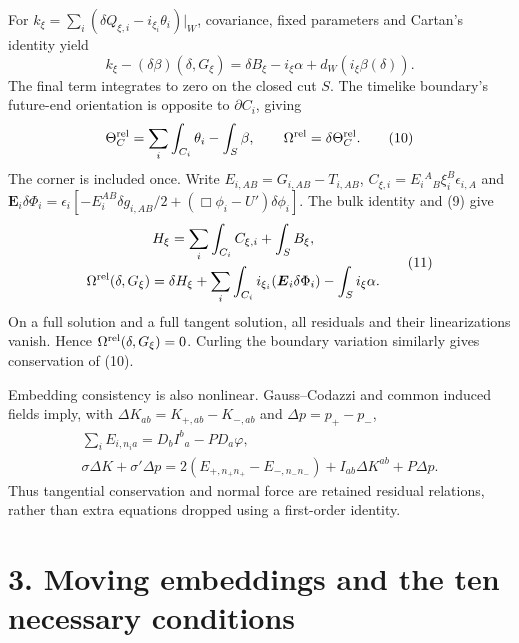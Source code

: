 \documentclass[
  10pt,
]{article}
\begin{document}
For \(k_\xi=\sum_i(\delta Q_{\xi,i}-i_{\xi_i}\theta_i)|_W\), covariance,
fixed parameters and Cartan's identity yield \[
 k_\xi-(\delta\beta)(\delta,G_\xi)
 =\delta B_\xi-i_\xi\alpha+d_W(i_\xi\beta(\delta)).       \tag{9}
\] The final term integrates to zero on the closed cut \(S\). The
timelike boundary's future-end orientation is opposite to
\(\partial C_i\), giving \[
 \Theta_C^{\rm rel}=\sum_i\int_{C_i}\theta_i-\int_S\beta,
 \qquad\Omega^{\rm rel}=\delta\Theta_C^{\rm rel}.         \tag{10}
\] The corner is included once. Write \(E_{i,AB}=G_{i,AB}-T_{i,AB}\),
\(C_{\xi,i}=E_i{}^A{}_B\xi_i^B\epsilon_{i,A}\) and
\(\boldsymbol E_i\delta\Phi_i=\epsilon_i[-E_i^{AB}\delta g_{i,AB}/2
+(\Box\phi_i-U')\delta\phi_i]\). The bulk identity and (9) give \[
 \begin{gathered}
 H_\xi=\sum_i\int_{C_i}C_{\xi,i}+\int_S B_\xi,\\
 \Omega^{\rm rel}(\delta,G_\xi)
 =\delta H_\xi+\sum_i\int_{C_i}i_{\xi_i}
           (\boldsymbol E_i\delta\Phi_i)-\int_S i_\xi\alpha .
 \end{gathered}                                           \tag{11}
\] On a full solution and a full tangent solution, all residuals and
their linearizations vanish. Hence \(\Omega^{\rm rel}(\delta,G_\xi)=0\).
Curling the boundary variation similarly gives conservation of (10).

Embedding consistency is also nonlinear. Gauss--Codazzi and common
induced fields imply, with \(\Delta K_{ab}=K_{+,ab}-K_{-,ab}\) and
\(\Delta p=p_+-p_-\), \[
 \begin{gathered}
 \sum_iE_{i,n_i a}=D_bI^b{}_a-PD_a\varphi,\\
 \sigma\Delta K+\sigma'\Delta p
 =2(E_{+,n_+n_+}-E_{-,n_-n_-})+I_{ab}\Delta K^{ab}+P\Delta p .
 \end{gathered}                                           \tag{12}
\] Thus tangential conservation and normal force are retained residual
relations, rather than extra equations dropped using a first-order
identity.

\section{3. Moving embeddings and the ten necessary
conditions}\label{moving-embeddings-and-the-ten-necessary-conditions}
\end{document}
